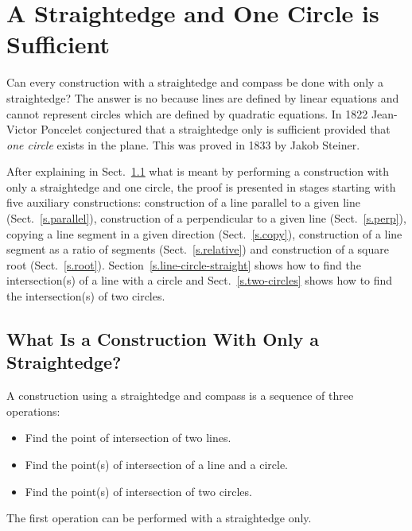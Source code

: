 
\chapter{A Straightedge and One Circle is Sufficient}\label{c.straightedge}




Can every construction with a straightedge and compass be done with only a straightedge? The answer is no because lines are defined by linear equations and cannot represent circles which are defined by quadratic equations. In 1822 Jean-Victor Poncelet conjectured that a straightedge only is sufficient provided that \emph{one circle} exists in the plane. This was proved in 1833 by Jakob Steiner.

After explaining in Sect.~\ref{s.se-what} what is meant by performing a construction with only a straightedge and one circle, the proof is presented in stages starting with five auxiliary constructions: construction of a line parallel to a given line (Sect.~\ref{s.parallel}), construction of a perpendicular to a given line (Sect.~\ref{s.perp}), copying a line segment in a given direction (Sect.~\ref{s.copy}), construction of a line segment as a ratio of segments (Sect.~\ref{s.relative}) and construction of a square root (Sect.~\ref{s.root}). Section~\ref{s.line-circle-straight} shows how to find the intersection(s) of a line with a circle and Sect.~\ref{s.two-circles} shows how to find the intersection(s) of two circles.

\section{What Is a Construction With Only a Straightedge?}\label{s.se-what}
A construction using a straightedge and compass is a sequence of three operations:
\begin{itemize}
\item Find the point of intersection of two lines.
\item Find the point(s) of intersection of a line and a circle.
\item Find the point(s) of intersection of two circles.
\end{itemize}
The first operation can be performed with a straightedge only.

